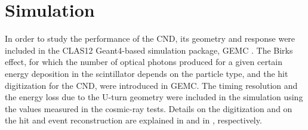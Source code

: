 \section{Simulation}
In order to study the performance of the CND, its geometry and response were included in the CLAS12 Geant4-based simulation package, GEMC \cite{sim-nim}. The Birks effect, for which the number of optical photons produced for a given certain energy deposition in the scintillator depends on the particle type, and the hit digitization for the CND, were introduced in GEMC.
The timing resolution and the energy loss due to the U-turn geometry were included in the simulation using the values measured in the cosmic-ray tests.
Details on the digitization and on the hit and event reconstruction are explained in \cite{sim-nim} and in \cite{recon-nim}, respectively.


